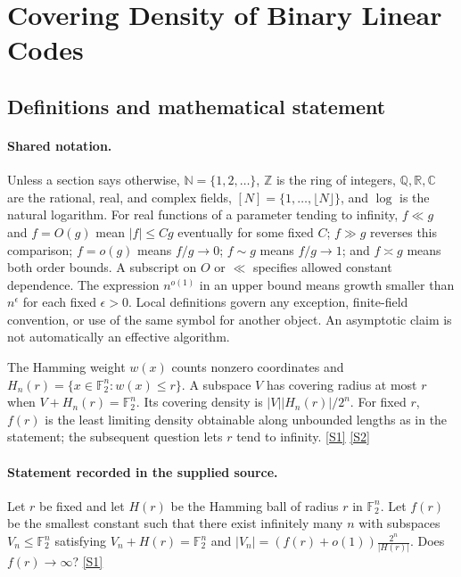\documentclass[11pt,a4paper]{article}
\newcommand{\N}{\mathbb{N}}
\newcommand{\Z}{\mathbb{Z}}
\newcommand{\Q}{\mathbb{Q}}
\newcommand{\R}{\mathbb{R}}
\newcommand{\C}{\mathbb{C}}
\newcommand{\F}{\mathbb{F}}
\newcommand{\sref}[2]{\hyperlink{source:#1:#2}{[S#2]}}
\begin{document}
\section{Covering Density of Binary Linear Codes}\label{statement}


\subsection{Definitions and mathematical statement}

\paragraph{Shared notation.}Unless a section says otherwise, $\N=\{1,2,\ldots\}$,
$\Z$ is the ring of integers, $\Q,\R,\C$ are the rational, real, and complex
fields, $[N]=\{1,\ldots,\lfloor N\rfloor\}$, and $\log$ is the natural
logarithm. For real functions of a parameter tending to infinity,
$f\ll g$ and $f=O(g)$ mean $|f|\leq Cg$ eventually for some fixed $C$;
$f\gg g$ reverses this comparison; $f=o(g)$ means $f/g\to0$;
$f\sim g$ means $f/g\to1$; and $f\asymp g$ means both order bounds.
A subscript on $O$ or $\ll$ specifies allowed constant dependence.
The expression $n^{o(1)}$ in an upper bound means growth smaller than
$n^\epsilon$ for each fixed $\epsilon>0$. Local definitions govern any
exception, finite-field convention, or use of the same symbol for another
object. An asymptotic claim is not automatically an effective algorithm.



The Hamming weight $w(x)$ counts nonzero coordinates and $H_n(r)=\{x\in\F_2^n:w(x)\leq r\}$. A subspace $V$ has covering radius at most $r$ when $V+H_n(r)=\F_2^n$. Its covering density is $|V||H_n(r)|/2^n$. For fixed $r$, $f(r)$ is the least limiting density obtainable along unbounded lengths as in the statement; the subsequent question lets $r$ tend to infinity. \sref{statement}{1} \sref{statement}{2}

\paragraph{Statement recorded in the supplied source.}
Let $r$ be fixed and let $H(r)$ be the Hamming ball of radius $r$ in $\mathbb{F}_2^n$. Let $f(r)$ be the smallest constant such that there exist infinitely many $n$ with subspaces $V_n \leq \mathbb{F}_2^n$ satisfying $V_n + H(r) = \mathbb{F}_2^n$ and $|V_n| = (f(r) + o(1)) \frac{2^n}{|H(r)|}$. Does $f(r) \to \infty$? \sref{statement}{1}
\end{document}
